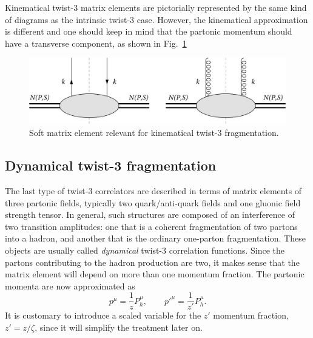 Kinematical twist-3 matrix elements are pictorially represented by the same kind of diagrams as the intrinsic twist-3 case. However, the kinematical approximation is different and one should keep in mind that the partonic momentum should have a transverse component, as shown in Fig.~\ref{fig:fragmentation corr K}

\begin{figure}[h]
    \centering
    \includegraphics[width=0.8\linewidth]{fig/phi corr.png}
    \caption{Soft matrix element relevant for kinematical twist-3 fragmentation.}
    \label{fig:fragmentation corr K}
\end{figure}

\subsection{Dynamical twist-3 fragmentation}
The last type of twist-3 correlators are described in terms of matrix elements of three partonic fields, typically two quark/anti-quark fields and one gluonic field strength tensor. In general, such structures are composed of an interference of two transition amplitudes: one that is a coherent fragmentation of two partons into a hadron, and another that is the ordinary one-parton fragmentation. These objects are usually called \textit{dynamical} twist-3 correlation functions. Since the partons contributing to the hadron production are two, it makes sense that the matrix element will depend on more than one momentum fraction. The partonic momenta are now approximated as
\begin{equation}
    p^\mu = \frac{1}{z}P_h^\mu,\qquad p'^\mu = \frac{1}{z'}P_h^\mu.
\end{equation}
It is customary to introduce a scaled variable for the $z'$ momentum fraction, $z'= z/\zeta$, since it will simplify the treatment later on.

